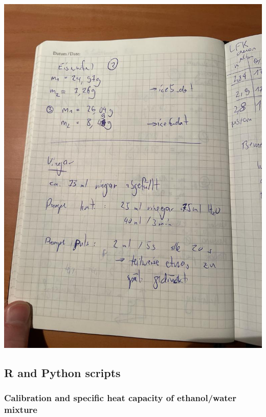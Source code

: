 \includegraphics[scale = 0.2]{figures/photo_5.jpg} 




\subsection{R and Python scripts} \label{r_scripts}



\subsubsection{Calibration and specific heat capacity of ethanol/water mixture}

 
 \label{append:unc_calib}


